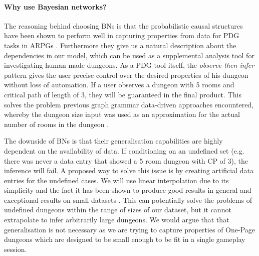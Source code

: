 \documentclass{UoYCSproject}
\begin{document}
\paragraph{Why use Bayesian networks?}
The reasoning behind choosing BNs is that the probabilistic causal structures have been shown to perform well in capturing properties from data for PDG tasks in ARPGs \parencite{SummervilleLearningOfZelda,SummervilleSamplingHyrule}. Furthermore they give us a natural description about the dependencies in our model, which can be used as a supplemental analysis tool for investigating human made dungeons. As a PDG tool itself, the \textit{observe-then-infer} pattern gives the user precise control over the desired properties of his dungeon without loss of automation. If a user observes a dungeon with 5 rooms and critical path of length of 3, they will be guaranteed in the final product. This solves the problem previous graph grammar data-driven approaches encountered, whereby the dungeon size input was used as an approximation for the actual number of rooms in the dungeon \parencite{Deery}.

The downside of BNs is that their generalisation capabilities are highly dependent on the availability of data. If conditioning on an undefined set (e.g. there was never a data entry that showed a 5 room dungeon with CP of 3), the inference will fail. A proposed way to solve this issue is by creating artificial data entries for the undefined cases. We will use linear interpolation due to its simplicity and the fact it has been shown to produce good results in general \parencite{Ibargengoytia2013OnTE} and exceptional results on small datasets \parencite{yu2004advances}. This can potentially solve the problems of undefined dungeons within the range of sizes of our dataset, but it cannot extrapolate to infer arbitrarily large dungeons. We would argue that that generalisation is not necessary as we are trying to capture properties of One-Page dungeons which are designed to be small enough to be fit in a single gameplay session. 
\end{document}
